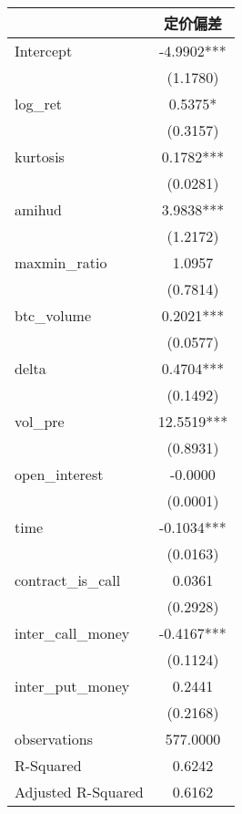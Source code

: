 \begin{tabular}{lc}
\hline
                   &    定价偏差     \\
\midrule
\midrule
Intercept          & -4.9902***  \\
                   & (1.1780)    \\
log\_ret           & 0.5375*     \\
                   & (0.3157)    \\
kurtosis           & 0.1782***   \\
                   & (0.0281)    \\
amihud             & 3.9838***   \\
                   & (1.2172)    \\
maxmin\_ratio      & 1.0957      \\
                   & (0.7814)    \\
btc\_volume        & 0.2021***   \\
                   & (0.0577)    \\
delta              & 0.4704***   \\
                   & (0.1492)    \\
vol\_pre           & 12.5519***  \\
                   & (0.8931)    \\
open\_interest     & -0.0000     \\
                   & (0.0001)    \\
time               & -0.1034***  \\
                   & (0.0163)    \\
contract\_is\_call & 0.0361      \\
                   & (0.2928)    \\
inter\_call\_money & -0.4167***  \\
                   & (0.1124)    \\
inter\_put\_money  & 0.2441      \\
                   & (0.2168)    \\
observations       & 577.0000    \\
R-Squared          & 0.6242      \\
Adjusted R-Squared & 0.6162      \\
\hline
\end{tabular}